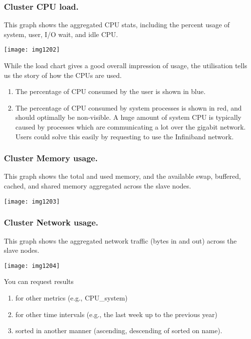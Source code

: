 \subsubsection{Cluster CPU load.}

This graph shows the aggregated CPU stats, including the percent usage of system, user, I/O wait, and idle CPU.

\texttt{[image: img1202]}

While the load chart gives a good overall impression of usage, the utilisation tells us the story of how the CPUs are used.

\begin{enumerate}
\item  The percentage of CPU consumed by the user is shown in blue.
\item  The percentage of CPU consumed by system processes is shown in red, and should optimally be non-visible.  A huge amount of system CPU is typically caused by processes which are communicating a lot over the gigabit network. Users could solve this easily by requesting to use the Infiniband network.
\end{enumerate}

\subsubsection{Cluster Memory usage.}

This graph shows the total and used memory, and the available swap, buffered,
cached, and shared memory aggregated across the slave nodes.

\texttt{[image: img1203]}

\subsubsection{Cluster Network usage.}

This graph shows the aggregated network traffic (bytes in and out) across the
slave nodes.

\texttt{[image: img1204]}

You can request results

\begin{enumerate}
\item  for other metrics (e.g., CPU\_system)
\item  for other time intervals (e.g., the last week up to the previous year)
\item  sorted in another manner (ascending, descending of sorted on name).
\end{enumerate}


